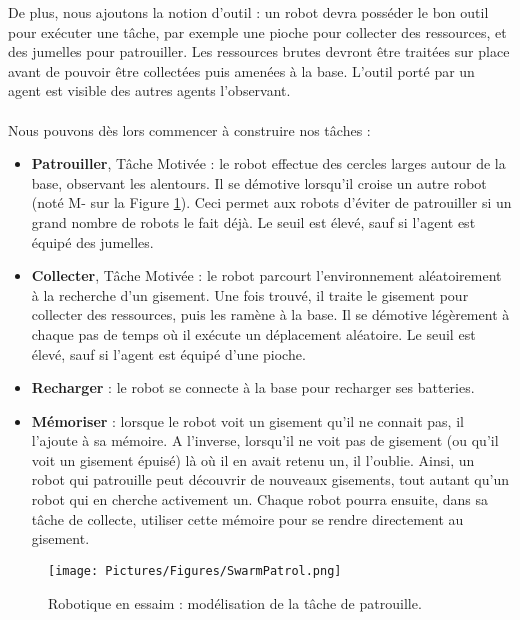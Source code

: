 		De plus, nous ajoutons la notion d'outil : un robot devra posséder le bon outil pour exécuter une tâche, par exemple une pioche pour collecter des ressources, et des jumelles pour patrouiller. Les ressources brutes devront être traitées sur place avant de pouvoir être collectées puis amenées à la base. L'outil porté par un agent est visible des autres agents l'observant.

		\paragraph{}
		Nous pouvons dès lors commencer à construire nos tâches :
		\begin{itemize}
			\item \textbf{Patrouiller}, Tâche Motivée : le robot effectue des cercles larges autour de la base, observant les alentours. Il se démotive lorsqu'il croise un autre robot (noté M- sur la Figure \ref{swarmPatrol}). Ceci permet aux robots d'éviter de patrouiller si un grand nombre de robots le fait déjà. Le seuil est élevé, sauf si l'agent est équipé des jumelles.
			\item \textbf{Collecter}, Tâche Motivée : le robot parcourt l'environnement aléatoirement à la recherche d'un gisement. Une fois trouvé, il traite le gisement pour collecter des ressources, puis les ramène à la base. Il se démotive légèrement à chaque pas de temps où il exécute un déplacement aléatoire. Le seuil est élevé, sauf si l'agent est équipé d'une pioche.
			\item \textbf{Recharger} : le robot se connecte à la base pour recharger ses batteries.
			\item \textbf{Mémoriser} : lorsque le robot voit un gisement qu'il ne connait pas, il l'ajoute à sa mémoire. A l'inverse, lorsqu'il ne voit pas de gisement (ou qu'il voit un gisement épuisé) là où il en avait retenu un, il l'oublie. Ainsi, un robot qui patrouille peut découvrir de nouveaux gisements, tout autant qu'un robot qui en cherche activement un. Chaque robot pourra ensuite, dans sa tâche de collecte, utiliser cette mémoire pour se rendre directement au gisement.
		\end{itemize}
	
	\begin{figure}
	\centering
	\texttt{[image: Pictures/Figures/SwarmPatrol.png]}
	\caption{Robotique en essaim : modélisation de la tâche de patrouille.}
	\label{swarmPatrol}
	\end{figure}
	
